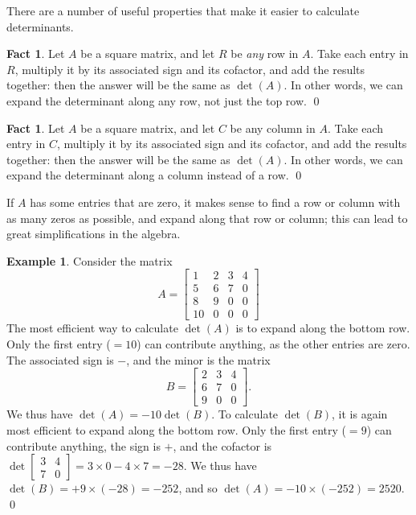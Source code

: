 \documentclass[a4paper]{book}
\newcommand{\RED}[1]{{\color{red}#1}}
\newcommand{\bbm}       {\begin{bmatrix}}
\newcommand{\ebm}       {\end{bmatrix}}
\newcommand{\tm}        {\times}
\renewcommand{\:}{\colon}
\newcommand{\EMPH}[1]{\RED{\emph{#1}}}
\theoremstyle{definition}
\newtheorem{fact}[theorem]{Fact}
\newtheorem{example}[theorem]{Example}
\begin{document}
There are a number of useful properties that make it easier to
calculate determinants.
\begin{fact}
 Let $A$ be a square matrix, and let $R$ be \EMPH{any} row in $A$.
 Take each entry in $R$, multiply it by its associated sign and its
 cofactor, and add the results together: then the answer will be the
 same as $\det(A)$.  In other words, we can expand the determinant
 along any row, not just the top row. \qed
\end{fact}
\begin{fact}
 Let $A$ be a square matrix, and let $C$ be any column in $A$.
 Take each entry in $C$, multiply it by its associated sign and its
 cofactor, and add the results together: then the answer will be the
 same as $\det(A)$.  In other words, we can expand the determinant
 along a column instead of a row. \qed
\end{fact}
If $A$ has some entries that are zero, it makes sense to find a row or
column with as many zeros as possible, and expand along that row or
column; this can lead to great simplifications in the algebra.
\begin{example}
 Consider the matrix
 {\small \[ A=\bbm 1&2&3&4 \\ 5&6&7&0 \\ 8&9&0&0 \\ 10&0&0&0 \ebm\]} 
 The most efficient way to calculate $\det(A)$ is to expand along the
 bottom row.  Only the first entry ($=10$) can contribute anything, as
 the other entries are zero.  The associated sign is $-$, and the
 minor is the matrix
 {\small \[ B=\bbm 2&3&4 \\ 6&7&0 \\ 9&0&0 \ebm. \]}
 We thus have $\det(A)=-10\det(B)$.  To calculate $\det(B)$, it is
 again most efficient to expand along the bottom row.  Only the first
 entry ($=9$) can contribute anything, the sign is $+$, and the
 cofactor is $\det\bbm 3&4\\7&0\ebm=3\tm 0-4\tm 7=-28$.  We thus have
 $\det(B)=+9\tm(-28)=-252$, and so $\det(A)=-10\tm(-252)=2520$. 
 \qed
\end{example}
\end{document}
